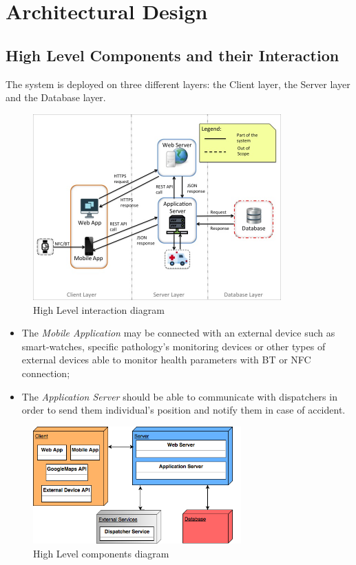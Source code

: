 \documentclass[a4paper]{article}
\begin{document}
\section{Architectural Design}
\subsection{High Level Components and their Interaction}
The system is deployed on three different layers: the Client layer, the Server layer and the Database layer.
\begin{figure}[!htpb]
    	\centering
    	\includegraphics[width=0.85\textwidth,keepaspectratio]{images/highlevel.jpg}
    	\caption{High Level interaction diagram}
\end{figure}
\begin{itemize}
    \item The \textit{Mobile Application} may be connected with an external device such as smart-watches, specific pathology's monitoring devices or other types of external devices able to monitor health parameters with BT or NFC connection;
    \item The \textit{Application Server} should be able to communicate with dispatchers in order to send them individual's position and notify them in case of accident.
\end{itemize}
\hfill
\begin{figure}[!htpb]
    	\centering
    	\includegraphics[width=80mm]{images/highlevel2.png}
    	\caption{High Level components diagram}
\end{figure}
\newpage
\end{document}

